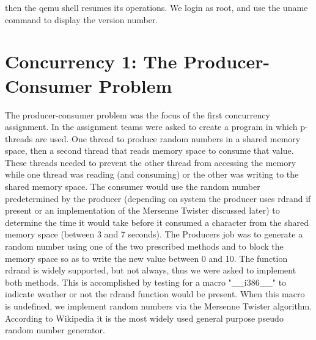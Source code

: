 \documentclass[letterpaper,10pt,draftclsnofoot,onecolumn]{IEEEtran}
\begin{document}
then the qemu shell resumes its operations. We login as root, and use the uname command to display the version number.

\section{Concurrency 1: The Producer-Consumer Problem}
The producer-consumer problem was the focus of the first concurrency assignment. In the assignment teams were asked to create a program in which p-threads are used. One thread to produce random numbers in a shared memory space, then a second thread that reads memory space to consume that value. These threads needed to prevent the other thread from accessing the memory while one thread was reading (and consuming) or the other was writing to the shared memory space. The consumer would use the random number predetermined by the producer (depending on system the producer uses rdrand if present or an implementation of the Mersenne Twister discussed later) to determine the time it would take before it consumed a character from the shared memory space (between 3 and 7 seconds). The Producers job was to generate a random number using one of the two prescribed methods and to block the memory space so as to write the new value between 0 and 10.
The function rdrand is widely supported, but not always, thus we were asked to implement both methods. This is accomplished by testing for a macro "\_\_i386\_\_" to indicate weather or not the rdrand function would be present. When this macro is undefined, we implement random numbers via the Mersenne Twister algorithm. According to Wikipedia it is the most widely used general purpose pseudo random number generator.
\end{document}
